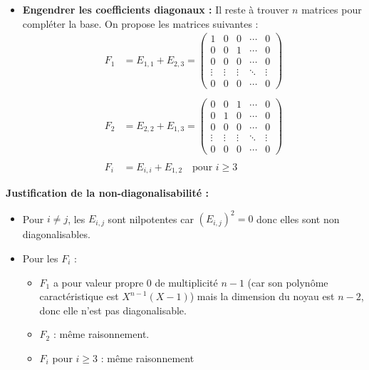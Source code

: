 \documentclass[a4paper,12pt]{article}
\begin{document}
\begin{correctionbox}
\begin{itemize}
        \item \textbf{Engendrer les coefficients diagonaux :} Il reste à trouver \( n \) matrices pour compléter la base. On propose les matrices suivantes : \\
          \begin{align*}
          F_1 &= E_{1,1} + E_{2,3} = \begin{pmatrix}
          1 & 0 & 0 & \cdots & 0 \\
          0 & 0 & 1 & \cdots & 0 \\
          0 & 0 & 0 & \cdots & 0 \\
          \vdots & \vdots & \vdots & \ddots & \vdots \\
          0 & 0 & 0 & \cdots & 0
          \end{pmatrix} \\\\
          F_2 &= E_{2,2} + E_{1,3} = \begin{pmatrix}
          0 & 0 & 1 & \cdots & 0 \\
          0 & 1 & 0 & \cdots & 0 \\
          0 & 0 & 0 & \cdots & 0 \\
          \vdots & \vdots & \vdots & \ddots & \vdots \\
          0 & 0 & 0 & \cdots & 0
          \end{pmatrix} \\\\
          F_i &= E_{i,i} + E_{1,2} \quad \text{pour } i \geq 3
          \end{align*}
        \end{itemize}
        
        \vspace{0.5em}
        
        \textbf{Justification de la non-diagonalisabilité :}
        
        \begin{itemize}

        \item Pour \( i \neq j \), les \( E_{i,j} \) sont nilpotentes car \( (E_{i,j})^2 = 0 \) donc elles sont non diagonalisables.
        
        \item Pour les \( F_i \) :
          \begin{itemize}
          \item \( F_1 \) a pour valeur propre 0 de multiplicité \( n-1 \) (car son polynôme caractéristique est \( X^{n-1}(X-1) \)) mais la dimension du noyau est \( n-2 \), donc elle n'est pas diagonalisable.
          \item \( F_2 \) : même raisonnement.
          \item \( F_i \) pour \( i \geq 3 \) : même raisonnement
          \end{itemize}
        \end{itemize}
        

\end{correctionbox}
\end{document}

